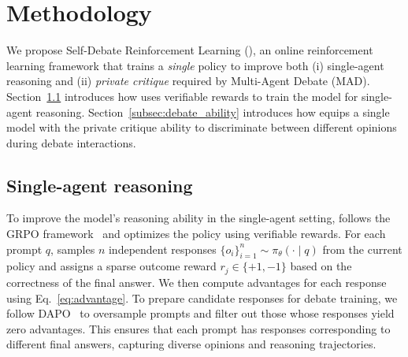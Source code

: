 \section{Methodology}
\label{methodology}

We propose Self-Debate Reinforcement Learning (\SDRL{}), an online reinforcement learning framework that trains a \emph{single} policy to improve both (i) single-agent reasoning and (ii) \emph{private critique} required by Multi-Agent Debate (MAD). Section~\ref{subsec:single_agent_reasoning} introduces how \SDRL{} uses verifiable rewards to train the model for single-agent reasoning. Section~\ref{subsec:debate_ability} introduces how \SDRL{} equips a single model with the private critique ability to discriminate between different opinions during debate interactions.

\subsection{Single-agent reasoning}
\label{subsec:single_agent_reasoning}

To improve the model’s reasoning ability in the single-agent setting, \SDRL{} follows the GRPO framework~\cite{shao2024deepseekmath} and optimizes the policy using verifiable rewards. For each prompt $q$, \SDRL{} samples $n$ independent responses  $\{o_i\}_{i=1}^n \sim \pi_\theta(\cdot \mid q)$ from the current policy and assigns a sparse outcome reward $r_j \in \{+1,-1\}$ based on the correctness of the final answer. We then compute advantages for each response using Eq.~\ref{eq:advantage}. To prepare candidate responses for debate training, we follow DAPO~\cite{yu2025dapo} to oversample prompts and filter out those whose responses yield zero advantages. This ensures that each prompt has responses corresponding to different final answers, capturing diverse opinions and reasoning trajectories.

